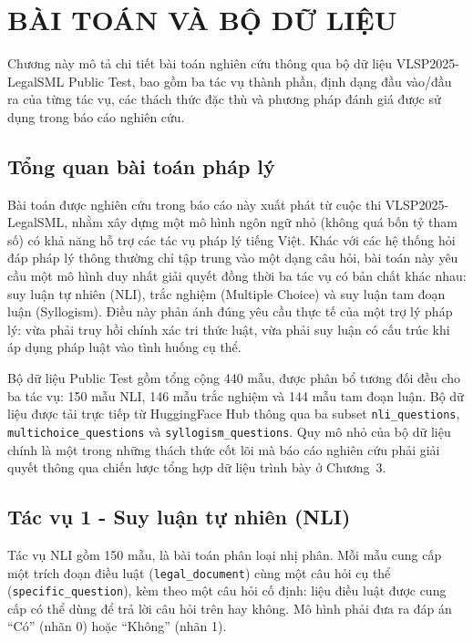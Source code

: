\chapter{BÀI TOÁN VÀ BỘ DỮ LIỆU}

Chương này mô tả chi tiết bài toán nghiên cứu thông qua bộ dữ liệu VLSP2025-LegalSML Public Test, bao gồm ba tác vụ thành phần, định dạng đầu vào/đầu ra của từng tác vụ, các thách thức đặc thù và phương pháp đánh giá được sử dụng trong báo cáo nghiên cứu.

\section{Tổng quan bài toán pháp lý}

Bài toán được nghiên cứu trong báo cáo này xuất phát từ cuộc thi VLSP2025-LegalSML, nhằm xây dựng một mô hình ngôn ngữ nhỏ (không quá bốn tỷ tham số) có khả năng hỗ trợ các tác vụ pháp lý tiếng Việt. Khác với các hệ thống hỏi đáp pháp lý thông thường chỉ tập trung vào một dạng câu hỏi, bài toán này yêu cầu một mô hình duy nhất giải quyết đồng thời ba tác vụ có bản chất khác nhau: suy luận tự nhiên (NLI), trắc nghiệm (Multiple Choice) và suy luận tam đoạn luận (Syllogism). Điều này phản ánh đúng yêu cầu thực tế của một trợ lý pháp lý: vừa phải truy hồi chính xác tri thức luật, vừa phải suy luận có cấu trúc khi áp dụng pháp luật vào tình huống cụ thể.

Bộ dữ liệu Public Test gồm tổng cộng 440 mẫu, được phân bổ tương đối đều cho ba tác vụ: 150 mẫu NLI, 146 mẫu trắc nghiệm và 144 mẫu tam đoạn luận. Bộ dữ liệu được tải trực tiếp từ HuggingFace Hub thông qua ba subset \texttt{nli\_questions}, \texttt{multichoice\_questions} và \texttt{syllogism\_questions}. Quy mô nhỏ của bộ dữ liệu chính là một trong những thách thức cốt lõi mà báo cáo nghiên cứu phải giải quyết thông qua chiến lược tổng hợp dữ liệu trình bày ở Chương~3.

\section{Tác vụ 1 - Suy luận tự nhiên (NLI)}

Tác vụ NLI gồm 150 mẫu, là bài toán phân loại nhị phân. Mỗi mẫu cung cấp một trích đoạn điều luật (\texttt{legal\_document}) cùng một câu hỏi cụ thể (\texttt{specific\_question}), kèm theo một câu hỏi cố định: liệu điều luật được cung cấp có thể dùng để trả lời câu hỏi trên hay không. Mô hình phải đưa ra đáp án ``Có'' (nhãn 0) hoặc ``Không'' (nhãn 1).

